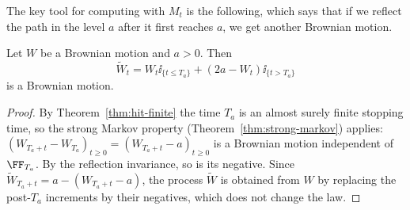 \documentclass[a4paper]{scrartcl}
\begin{document}
The key tool for computing with $M_t$ is the following, which says that if we reflect the path in the level $a$ after it first reaches $a$, we get another Brownian motion.

\begin{theorem}\label{thm:reflection}
	Let $W$ be a Brownian motion and $a > 0$. Then
	$$
	\tilde W_t = W_t\ii_{\{t\leq T_a\}} + (2a-W_t)\ii_{\{t> T_a\}}
	$$
	is a Brownian motion.
\end{theorem}

\begin{proof}
	By Theorem~\ref{thm:hit-finite} the time $T_a$ is an almost surely finite stopping time, so the strong Markov property (Theorem~\ref{thm:strong-markov}) applies: $(W_{T_a+t}-W_{T_a})_{t\geq0} = (W_{T_a+t}-a)_{t\geq0}$ is a Brownian motion independent of $\FF_{T_a}$. By the reflection invariance, so is its negative. Since $\tilde W_{T_a+t} = a - (W_{T_a+t}-a)$, the process $\tilde W$ is obtained from $W$ by replacing the post-$T_a$ increments by their negatives, which does not change the law.
\end{proof}
\end{document}
